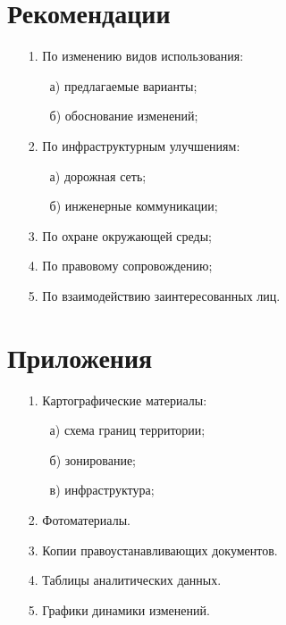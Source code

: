 \section{Рекомендации}
\label{sec:rek}

\begin{enumerate}
    \item[1.] По изменению видов использования:
    \begin{enumerate}
        \item[а)] предлагаемые варианты;
        \item[б)] обоснование изменений;
    \end{enumerate}
    \item[2.] По инфраструктурным улучшениям:
    \begin{enumerate}
        \item[а)] дорожная сеть;
        \item[б)] инженерные коммуникации;
    \end{enumerate}
    \item[3.] По охране окружающей среды;
    \item[4.] По правовому сопровождению;
    \item[5.] По взаимодействию заинтересованных лиц.
\end{enumerate}

\section*{Приложения}
\label{sec:pril}

\begin{enumerate}
    \item[1.] Картографические материалы:
    \begin{enumerate}
        \item[а)] схема границ территории;
        \item[б)] зонирование;
        \item[в)] инфраструктура;
    \end{enumerate}
    \item[2.] Фотоматериалы.
    \item[3.] Копии правоустанавливающих документов.
    \item[4.] Таблицы аналитических данных.
    \item[5.] Графики динамики изменений.
\end{enumerate}

